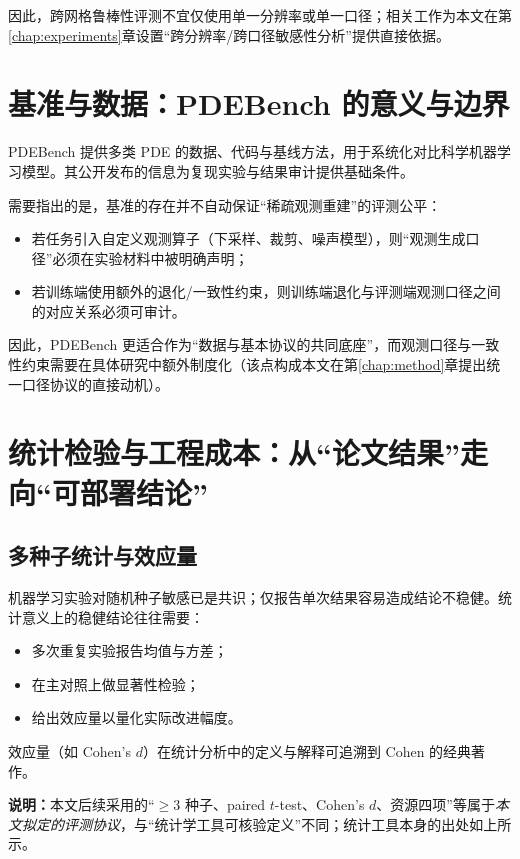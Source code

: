 因此，跨网格鲁棒性评测不宜仅使用单一分辨率或单一口径；相关工作为本文在第\ref{chap:experiments}章设置“跨分辨率/跨口径敏感性分析”提供直接依据\cite{bartolucci2023reno}。


\section{基准与数据：PDEBench 的意义与边界}\label{sec:rw_pdebench}

PDEBench 提供多类 PDE 的数据、代码与基线方法，用于系统化对比科学机器学习模型\cite{takamoto2022pdebench}。其公开发布的信息为复现实验与结果审计提供基础条件\cite{takamoto2022pdebench}。

需要指出的是，基准的存在并不自动保证“稀疏观测重建”的评测公平：
\begin{itemize}
  \item 若任务引入自定义观测算子（下采样、裁剪、噪声模型），则“观测生成口径”必须在实验材料中被明确声明；
  \item 若训练端使用额外的退化/一致性约束，则训练端退化与评测端观测口径之间的对应关系必须可审计。
\end{itemize}

因此，PDEBench 更适合作为“数据与基本协议的共同底座”，而观测口径与一致性约束需要在具体研究中额外制度化（该点构成本文在第\ref{chap:method}章提出统一口径协议的直接动机）。


\section{统计检验与工程成本：从“论文结果”走向“可部署结论”}\label{sec:rw_stats_cost}

\subsection{多种子统计与效应量}\label{subsec:rw_stats}

机器学习实验对随机种子敏感已是共识；仅报告单次结果容易造成结论不稳健。统计意义上的稳健结论往往需要：
\begin{itemize}
  \item 多次重复实验报告均值与方差；
  \item 在主对照上做显著性检验；
  \item 给出效应量以量化实际改进幅度。
\end{itemize}

效应量（如 Cohen's $d$）在统计分析中的定义与解释可追溯到 Cohen 的经典著作\cite{cohen1988power}。

\noindent\textbf{说明：}本文后续采用的“$\geq 3$ 种子、paired $t$-test、Cohen's $d$、资源四项”等属于\emph{本文拟定的评测协议}，与“统计学工具可核验定义”不同；统计工具本身的出处如上所示。


